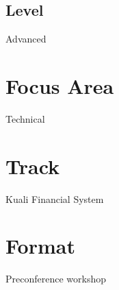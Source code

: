 \documentclass[12pt,notitlepage]{article}
\begin{document}
\subsection{Level}
Advanced

\section{Focus Area}
Technical

\section{Track}
Kuali Financial System

\section{Format}
Preconference workshop
\end{document}
